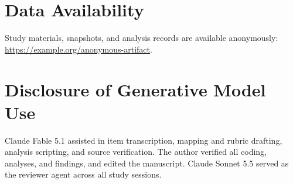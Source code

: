 \documentclass[10pt,conference]{IEEEtran}
\begin{document}
\section*{Data Availability}
Study materials, snapshots, and analysis records are available anonymously: \url{https://example.org/anonymous-artifact}.

\section*{Disclosure of Generative Model Use}
Claude Fable 5.1 assisted in item transcription, mapping and rubric drafting, analysis scripting, and source verification. The author verified all coding, analyses, and findings, and edited the manuscript. Claude Sonnet 5.5 served as the reviewer agent across all study sessions.


\end{document}
